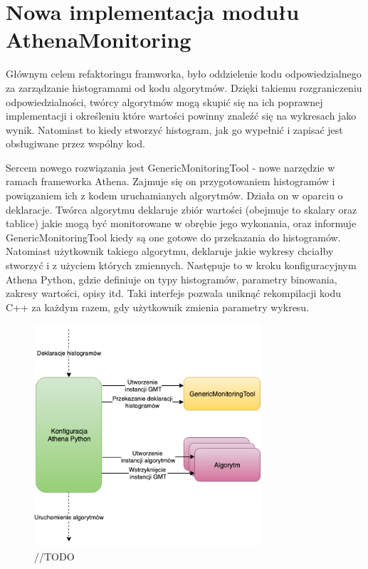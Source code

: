 \section{Nowa implementacja modułu AthenaMonitoring}
Głównym celem refaktoringu framworka, było oddzielenie kodu odpowiedzialnego za zarządzanie histogramami od kodu algorytmów. 
Dzięki takiemu rozgraniczeniu odpowiedzialności, twórcy algorytmów mogą skupić się na ich poprawnej implementacji i określeniu które wartości powinny znaleźć się na wykresach jako wynik. 
Natomiast to kiedy stworzyć histogram, jak go wypełnić i zapisać jest obsługiwane przez wspólny kod. 

Sercem nowego rozwiązania jest GenericMonitoringTool - nowe narzędzie w ramach frameworka Athena.
Zajmuje się on przygotowaniem histogramów i powiązaniem ich z kodem uruchamianych algorytmów. 
Działa on w oparciu o deklaracje.
Twórca algorytmu deklaruje zbiór wartości (obejmuje to skalary oraz tablice) jakie mogą być monitorowane w obrębie jego wykonania, oraz informuje GenericMonitoringTool kiedy są one gotowe do przekazania do histogramów.
Natomiast użytkownik takiego algorytmu, deklaruje jakie wykresy chciałby stworzyć i z użyciem których zmiennych. 
Następuje to w kroku konfiguracyjnym Athena Python, gdzie definiuje on typy histogramów, parametry binowania, zakresy wartości, opisy itd. 
Taki interfejs pozwala uniknąć rekompilacji kodu C++ za każdym razem, gdy użytkownik zmienia parametry wykresu. 

\begin{figure}[!ht]
\centering
\includegraphics[width=0.75\textwidth]{img/algo_init.png}
\caption{
//TODO
}
\label{fig:athena:oldFlow}
\end{figure}

